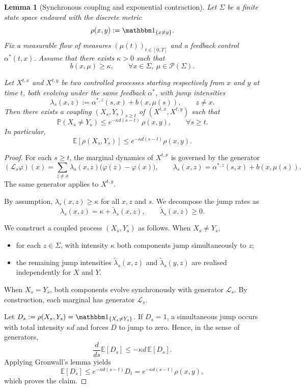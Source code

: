 \documentclass[11pt,a4paper]{amsart}
\newtheorem{lemma}{Lemma}
\theoremstyle{definition}
\begin{document}
\begin{lemma}[Synchronous coupling and exponential contraction]
\label{lem:coupling}
Let $\Sigma$ be a finite state space endowed with the discrete metric
\[
\rho(x,y) := \mathbbm 1_{\{x\neq y\}}.
\]
Fix a measurable flow of measures $(\mu(t))_{t\in[0,T]}$ and a feedback control
$\alpha^*(t,x)$.
Assume that there exists $\kappa>0$ such that
\[
b(x,\mu) \ge \kappa,
\qquad \forall x\in\Sigma,\ \mu\in\mathcal P(\Sigma).
\]

Let $X^{t,x}$ and $X^{t,y}$ be two controlled processes starting respectively from
$x$ and $y$ at time $t$, both evolving under the same feedback $\alpha^*$, with jump
intensities
\[
\lambda_s(x,z) := \alpha^{*,z}(s,x) + b(x,\mu(s)), \qquad z\neq x.
\]
Then there exists a coupling $(X_s,Y_s)_{s\ge t}$ of
$(X^{t,x},X^{t,y})$ such that
\[
\mathbb P(X_s \neq Y_s)
\le e^{- \kappa d (s-t)} \, \rho(x,y),
\qquad \forall s\ge t.
\]
In particular,
\[
\mathbb E[\rho(X_s,Y_s)] \le e^{- \kappa d (s-t)} \rho(x,y).
\]
\end{lemma}
\begin{proof}
For each $s\ge t$, the marginal dynamics of $X^{t,x}$ is governed by the generator
\[
(\mathcal L_s \varphi)(x)
= \sum_{z\neq x} \lambda_s(x,z)\big(\varphi(z)-\varphi(x)\big),
\qquad
\lambda_s(x,z) = \alpha^{*,z}(s,x) + b(x,\mu(s)).
\]
The same generator applies to $X^{t,y}$.

By assumption, $\lambda_s(x,z)\ge \kappa$ for all $x,z$ and $s$.
We decompose the jump rates as
\[
\lambda_s(x,z) = \kappa + \tilde\lambda_s(x,z),
\qquad \tilde\lambda_s(x,z) \ge 0.
\]

We construct a coupled process $(X_s,Y_s)$ as follows.
When $X_s \neq Y_s$,
\begin{itemize}
\item for each $z\in\Sigma$, with intensity $\kappa$ both components jump
simultaneously to $z$;
\item the remaining jump intensities $\tilde\lambda_s(x,z)$ and
$\tilde\lambda_s(y,z)$ are realised independently for $X$ and $Y$.
\end{itemize}
When $X_s=Y_s$, both components evolve synchronously with generator $\mathcal L_s$.
By construction, each marginal has generator $\mathcal L_s$.

Let $D_s := \rho(X_s,Y_s)=\mathbbm 1_{\{X_s\neq Y_s\}}$.
If $D_s=1$, a simultaneous jump occurs with total intensity $\kappa d$ and
forces $D$ to jump to zero. Hence, in the sense of generators,
\[
\frac{d}{ds}\mathbb E[D_s]
\le - \kappa d \, \mathbb E[D_s].
\]
Applying Gronwall's lemma yields
\[
\mathbb E[D_s] \le e^{-\kappa d(s-t)} D_t
= e^{-\kappa d(s-t)} \rho(x,y),
\]
which proves the claim.
\end{proof}
\end{document}

